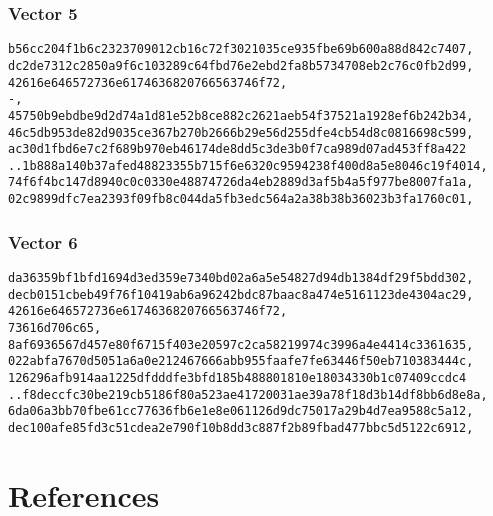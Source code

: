 \documentclass[
]{article}
\begin{document}
\hypertarget{vector-5}{%
\subsubsection{Vector 5}\label{vector-5}}

\begin{verbatim}
b56cc204f1b6c2323709012cb16c72f3021035ce935fbe69b600a88d842c7407,
dc2de7312c2850a9f6c103289c64fbd76e2ebd2fa8b5734708eb2c76c0fb2d99,
42616e646572736e6174636820766563746f72,
-,
45750b9ebdbe9d2d74a1d81e52b8ce882c2621aeb54f37521a1928ef6b242b34,
46c5db953de82d9035ce367b270b2666b29e56d255dfe4cb54d8c0816698c599,
ac30d1fbd6e7c2f689b970eb46174de8dd5c3de3b0f7ca989d07ad453ff8a422
..1b888a140b37afed48823355b715f6e6320c9594238f400d8a5e8046c19f4014,
74f6f4bc147d8940c0c0330e48874726da4eb2889d3af5b4a5f977be8007fa1a,
02c9899dfc7ea2393f09fb8c044da5fb3edc564a2a38b38b36023b3fa1760c01,
\end{verbatim}

\hypertarget{vector-6}{%
\subsubsection{Vector 6}\label{vector-6}}

\begin{verbatim}
da36359bf1bfd1694d3ed359e7340bd02a6a5e54827d94db1384df29f5bdd302,
decb0151cbeb49f76f10419ab6a96242bdc87baac8a474e5161123de4304ac29,
42616e646572736e6174636820766563746f72,
73616d706c65,
8af6936567d457e80f6715f403e20597c2ca58219974c3996a4e4414c3361635,
022abfa7670d5051a6a0e212467666abb955faafe7fe63446f50eb710383444c,
126296afb914aa1225dfdddfe3bfd185b488801810e18034330b1c07409ccdc4
..f8deccfc30be219cb5186f80a523ae41720031ae39a78f18d3b14df8bb6d8e8a,
6da06a3bb70fbe61cc77636fb6e1e8e061126d9dc75017a29b4d7ea9588c5a12,
dec100afe85fd3c51cdea2e790f10b8dd3c887f2b89fbad477bbc5d5122c6912,
\end{verbatim}

\hypertarget{references}{%
\section*{References}\label{references}}
\end{document}
